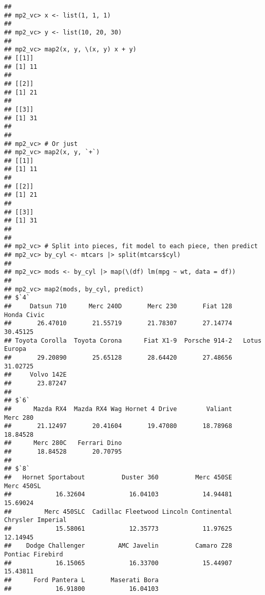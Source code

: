 \documentclass[
]{book}
\begin{document}
\begin{verbatim}
## 
## mp2_vc> x <- list(1, 1, 1)
## 
## mp2_vc> y <- list(10, 20, 30)
## 
## mp2_vc> map2(x, y, \(x, y) x + y)
## [[1]]
## [1] 11
## 
## [[2]]
## [1] 21
## 
## [[3]]
## [1] 31
## 
## 
## mp2_vc> # Or just
## mp2_vc> map2(x, y, `+`)
## [[1]]
## [1] 11
## 
## [[2]]
## [1] 21
## 
## [[3]]
## [1] 31
## 
## 
## mp2_vc> # Split into pieces, fit model to each piece, then predict
## mp2_vc> by_cyl <- mtcars |> split(mtcars$cyl)
## 
## mp2_vc> mods <- by_cyl |> map(\(df) lm(mpg ~ wt, data = df))
## 
## mp2_vc> map2(mods, by_cyl, predict)
## $`4`
##     Datsun 710      Merc 240D       Merc 230       Fiat 128    Honda Civic 
##       26.47010       21.55719       21.78307       27.14774       30.45125 
## Toyota Corolla  Toyota Corona      Fiat X1-9  Porsche 914-2   Lotus Europa 
##       29.20890       25.65128       28.64420       27.48656       31.02725 
##     Volvo 142E 
##       23.87247 
## 
## $`6`
##      Mazda RX4  Mazda RX4 Wag Hornet 4 Drive        Valiant       Merc 280 
##       21.12497       20.41604       19.47080       18.78968       18.84528 
##      Merc 280C   Ferrari Dino 
##       18.84528       20.70795 
## 
## $`8`
##   Hornet Sportabout          Duster 360          Merc 450SE          Merc 450SL 
##            16.32604            16.04103            14.94481            15.69024 
##         Merc 450SLC  Cadillac Fleetwood Lincoln Continental   Chrysler Imperial 
##            15.58061            12.35773            11.97625            12.14945 
##    Dodge Challenger         AMC Javelin          Camaro Z28    Pontiac Firebird 
##            16.15065            16.33700            15.44907            15.43811 
##      Ford Pantera L       Maserati Bora 
##            16.91800            16.04103
\end{verbatim}

  
\end{document}
